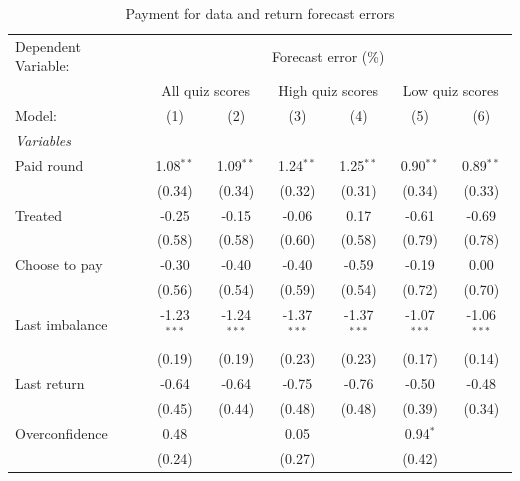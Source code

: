 \begin{table}[htbp]
   \caption{Payment for data and return forecast errors}
   \centering
   \begin{tabular}{lcccccc}
      \tabularnewline \midrule \midrule
      Dependent Variable: & \multicolumn{6}{c}{Forecast error (\%)}\\
       & \multicolumn{2}{c}{All quiz scores} & \multicolumn{2}{c}{High quiz scores} & \multicolumn{2}{c}{Low quiz scores} \\ 
      Model:             & (1)           & (2)           & (3)           & (4)           & (5)           & (6)\\  
      \midrule
      \emph{Variables}\\
      Paid round         & 1.08$^{**}$   & 1.09$^{**}$   & 1.24$^{**}$   & 1.25$^{**}$   & 0.90$^{**}$   & 0.89$^{**}$\\   
                         & (0.34)        & (0.34)        & (0.32)        & (0.31)        & (0.34)        & (0.33)\\   
      Treated            & -0.25         & -0.15         & -0.06         & 0.17          & -0.61         & -0.69\\   
                         & (0.58)        & (0.58)        & (0.60)        & (0.58)        & (0.79)        & (0.78)\\   
      Choose to pay      & -0.30         & -0.40         & -0.40         & -0.59         & -0.19         & 0.00\\   
                         & (0.56)        & (0.54)        & (0.59)        & (0.54)        & (0.72)        & (0.70)\\   
      Last imbalance     & -1.23$^{***}$ & -1.24$^{***}$ & -1.37$^{***}$ & -1.37$^{***}$ & -1.07$^{***}$ & -1.06$^{***}$\\   
                         & (0.19)        & (0.19)        & (0.23)        & (0.23)        & (0.17)        & (0.14)\\   
      Last return        & -0.64         & -0.64         & -0.75         & -0.76         & -0.50         & -0.48\\   
                         & (0.45)        & (0.44)        & (0.48)        & (0.48)        & (0.39)        & (0.34)\\   
      Overconfidence     & 0.48          &               & 0.05          &               & 0.94$^{*}$    &   \\   
                         & (0.24)        &               & (0.27)        &               & (0.42)        &   \\   

\end{tabular}
\end{table}
